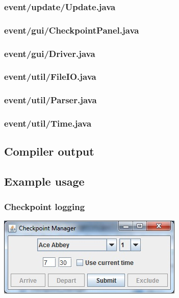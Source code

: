 \documentclass[a4paper, twoside]{article}
\begin{document}
\subsubsection{event/update/Update.java}

\subsubsection{event/gui/CheckpointPanel.java}

\subsubsection{event/gui/Driver.java}

\subsubsection{event/util/FileIO.java}

\subsubsection{event/util/Parser.java}

\subsubsection{event/util/Time.java}

\subsection{Compiler output}
\lstset{tabsize=2, breaklines=true, breakatwhitespace=false, basicstyle=\ttfamily}

\lstset{tabsize=2, breaklines=true, breakatwhitespace=true, basicstyle=\ttfamily}
\subsection{Example usage}
\subsubsection{Checkpoint logging}
\includegraphics{screenshot1.jpg}
\end{document}
